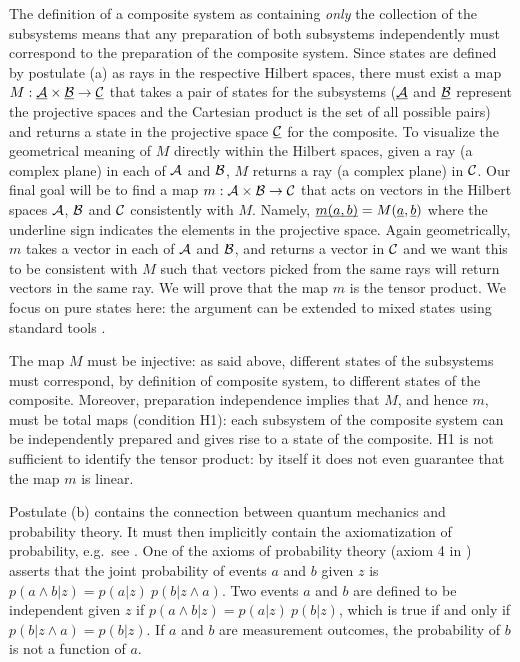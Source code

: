 \documentclass[aps,prl,amsmath,amssymb,twocolumn]{revtex4}
\theoremstyle{plain}
\theoremstyle{definition}
\theoremstyle{remark}
\newcommand{\pj}[1] {\underbar{$#1$}}
\begin{document}
	The definition of a composite system as containing {\em only} the
	collection of the subsystems means that any preparation of both
	subsystems independently must correspond to the preparation of the
	composite system. Since states are defined by postulate (a) as rays in
	the respective Hilbert spaces, there must exist a map $M : \pj{\cal A}
	\times \pj{\cal B } \to \pj{\cal C}$ that takes a pair of states for
	the subsystems ($\pj{\cal A}$ and $\pj{\cal B }$ represent the
	projective spaces and the Cartesian product is the set of all possible
	pairs) and returns a state in the projective space $\pj{\cal C}$ for
	the composite. To visualize the geometrical meaning of $M$ directly within the Hilbert spaces, given a ray (a complex plane) in each of $\cal A$ and $\cal B$, $M$ returns a ray (a complex plane) in $\cal C$.  Our final goal will be to find a map
	$m:{\cal A}\times{\cal B}\to{\cal C}$ that acts on vectors in the
	Hilbert spaces $\cal A$, $\cal B$ and $\cal C$ consistently with $M$. Namely,
	$\pj{m(a,b)}=M(\pj{a},\pj{b})$ where the underline sign indicates the
	elements in the projective space. Again geometrically, $m$ takes a vector in each of $\cal A$ and $\cal B$, and returns a vector in $\cal C$ and we want this to be consistent with $M$ such that vectors picked from the same rays will return vectors in the same ray. We will prove that the map $m$ is
	the tensor product. We focus on pure states here: the argument can be
	extended to mixed states using standard tools \cite{ballentine}.
	
	The map $M$ must be injective: as said above, different states of the
	subsystems must correspond, by definition of composite system, to
	different states of the composite. Moreover, preparation independence
	implies that $M$, and hence $m$, must be total maps (condition H1): each subsystem of
	the composite system can be independently prepared and gives rise to a
	state of the composite.  H1 is not sufficient
	to identify the tensor product: by itself it does not even guarantee
	that the map $m$ is linear.
	
	Postulate (b) contains the connection between quantum mechanics
	and probability theory. It must then implicitly contain the
	axiomatization of probability, e.g.~see
	\cite{ballentinepaper,ballentinebook,cox}. One of the axioms of
	probability theory (axiom 4 in \cite{ballentinepaper}) asserts that
	the joint probability of events $a$ and $b$ given $z$ is
	$p(a\wedge b|z)=p(a|z)\:p(b|z\wedge a)$. Two events $a$ and $b$ are defined to be 
	independent given $z$ if $p(a\wedge b|z)=p(a|z)\:p(b|z)$, which is true if and only if $p(b|z\wedge a)=p(b|z)$. If $a$ and $b$ are measurement outcomes, the probability of $b$ is not a function of $a$. 
	
\end{document}
